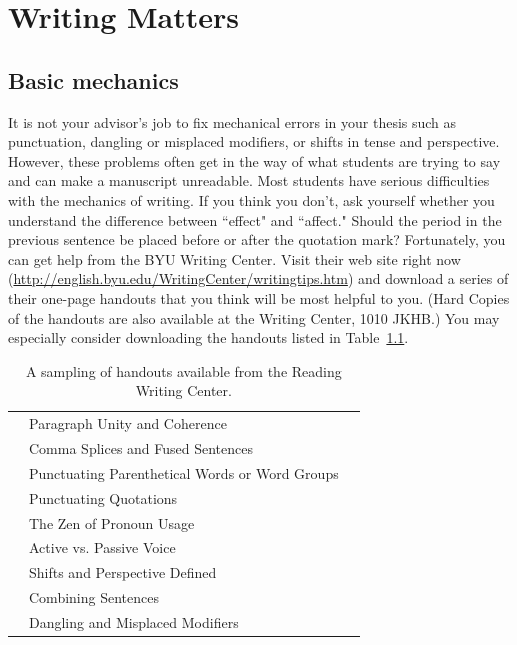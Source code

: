 \chapter{Writing Matters}
\label{chap:WritingMatters}

\section{Basic mechanics}
\label{sec:BasicMechanics} 

It is not your advisor's job to fix mechanical errors in your thesis
such as punctuation, dangling or misplaced modifiers, or shifts in
tense and perspective. However, these problems often get in the way
of what students are trying to say and can make a manuscript
unreadable. Most students have serious difficulties with the
mechanics of writing. If you think you don't, ask yourself whether
you understand the difference between ``effect" and ``affect."
Should the period in the previous sentence be placed before or after
the quotation mark? Fortunately, you can get help from the BYU
Writing Center. Visit their web site right now
(\href{http://english.byu.edu/WritingCenter/writingtips.htm}
{\url{http://english.byu.edu/WritingCenter/writingtips.htm}}) and
download a series of their one-page handouts that you think will be
most helpful to you. (Hard Copies of the handouts are also available
at the Writing Center, 1010 JKHB.) You may especially consider
downloading the handouts listed in Table~\ref{table:handouts}.

\begin{table}
    \begin{center}
    \begin{tabular}{lll}
    \hline \hline
    &Paragraph Unity and Coherence &\\
    &Comma Splices and Fused Sentences &\\
    &Punctuating Parenthetical Words or Word Groups &\\
    &Punctuating Quotations &\\
    &The Zen of Pronoun Usage &\\
    &Active vs. Passive Voice &\\
    &Shifts and Perspective Defined &\\
    &Combining Sentences &\\
    &Dangling and Misplaced Modifiers &\\
    \hline \hline
    \end{tabular}
    \end{center}
    \caption{\label{table:handouts} A sampling of handouts available from the Reading Writing Center.}
\end{table}

